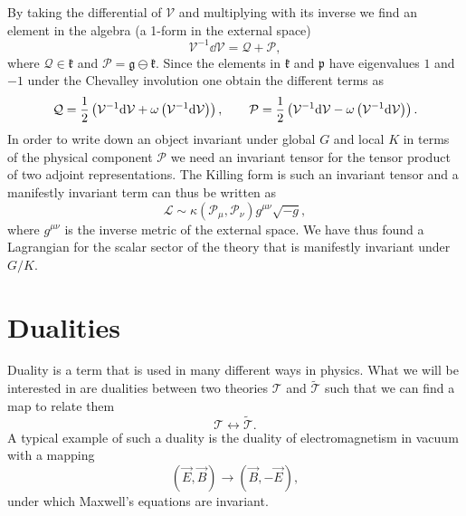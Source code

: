 By taking the differential of $\mathcal{V}$ and multiplying with its inverse we find an element in the algebra (a 1-form in the external space)
\begin{equation}
    \mathcal{V}^{-1}\dd \mathcal{V} = \mathcal{Q}+\mathcal{P},
\end{equation}
where $\mathcal{Q}\in\mathfrak{k}$ and $\mathcal{P}=\mathfrak{g}\ominus\mathfrak{k}$. Since the elements in $\mathfrak{k}$ and $\mathfrak{p}$ have eigenvalues $1$ and $-1$ under the Chevalley involution one obtain the different terms as
\begin{equation}
    \mathcal{Q} = \frac{1}{2}\left(\mathcal{V}^{-1}\mathrm{d} \mathcal{V}+\omega\left(\mathcal{V}^{-1}\mathrm{d} \mathcal{V}\right)\right),\\\qquad \mathcal{P} = \frac{1}{2}\left(\mathcal{V}^{-1}\mathrm{d} \mathcal{V}-\omega\left(\mathcal{V}^{-1}\mathrm{d} \mathcal{V}\right)\right).
\end{equation}
In order to write down an object invariant under global $G$ and local $K$ in terms of the physical component $\mathcal{P}$ we need an invariant tensor for the tensor product of two adjoint representations. The Killing form is such an invariant tensor and a manifestly invariant term can thus be written as 
\begin{equation}
    \mathcal{L} \sim \kappa(\mathcal{P}_\mu,\mathcal{P}_\nu)g^{\mu\nu}\sqrt{-g},
\end{equation}
where $g^{\mu\nu}$ is the inverse metric of the external space. We have thus found a Lagrangian for the scalar sector of the theory that is manifestly invariant under $G/K$. 


\section{Dualities}\label{sec:Dualities}
Duality is a term that is used in many different ways in physics. What we will be interested in are dualities between two theories $\mathscr{T}$ and $\tilde{\mathscr{T}}$ such that we can find a map to relate them 
\begin{equation}
    \mathscr{T} \leftrightarrow \mathscr{\tilde{T}}.
\end{equation}
A typical example of such a duality is the duality of electromagnetism in vacuum with a mapping 
\begin{equation}
    \left(\vec{E},\vec{B}\right) \to \left(\vec{B},-\vec{E}\right),
\end{equation}
under which Maxwell's equations are invariant. 

